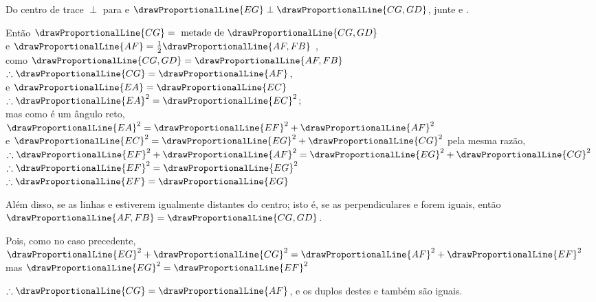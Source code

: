 \documentclass[booklanguage=brazilian]{byrnebook}
\begin{document}
\begin{center}
Do centro de  trace  $\perp$ para  e $\drawProportionalLine{EG} \perp \drawProportionalLine{CG,GD}$, junte  e .

Então $\drawProportionalLine{CG} = \mbox{ metade de } \drawProportionalLine{CG,GD}$ \\
e $\drawProportionalLine{AF} = \frac{1}{2} \drawProportionalLine{AF,FB}$ ,\\
como $\drawProportionalLine{CG,GD} = \drawProportionalLine{AF,FB}$ \byref{\hypref}\\
$\therefore \drawProportionalLine{CG} = \drawProportionalLine{AF}$,\\
e $\drawProportionalLine{EA} = \drawProportionalLine{EC}$ \\
$\therefore \drawProportionalLine{EA}^2 = \drawProportionalLine{EC}^2$;\\
mas como  é um ângulo reto,\\
$\drawProportionalLine{EA}^2 = \drawProportionalLine{EF}^2 + \drawProportionalLine{AF}^2$ \\
e $\drawProportionalLine{EC}^2 = \drawProportionalLine{EG}^2 + \drawProportionalLine{CG}^2$ pela mesma razão,\\
$\therefore \drawProportionalLine{EF}^2 + \drawProportionalLine{AF}^2 = \drawProportionalLine{EG}^2 + \drawProportionalLine{CG}^2$\\
$\therefore \drawProportionalLine{EF}^2 = \drawProportionalLine{EG}^2$\\
$\therefore \drawProportionalLine{EF} = \drawProportionalLine{EG}$
\end{center}

Além disso, se as linhas  e  estiverem igualmente distantes do centro; isto é, se as perpendiculares  e  forem iguais, então $\drawProportionalLine{AF,FB} = \drawProportionalLine{CG,GD}$.

\begin{center}
Pois, como no caso precedente,\\
$\drawProportionalLine{EG}^2 + \drawProportionalLine{CG}^2 = \drawProportionalLine{AF}^2 + \drawProportionalLine{EF}^2$\\
mas $\drawProportionalLine{EG}^2 = \drawProportionalLine{EF}^2$

$\therefore \drawProportionalLine{CG} = \drawProportionalLine{AF}$,%
e os duplos destes  e  também são iguais.
\end{center}
\end{document}
